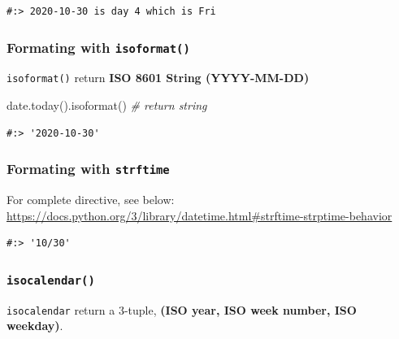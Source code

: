 \documentclass[
]{book}
\newenvironment{Shaded}{\begin{snugshade}}{\end{snugshade}}
\newcommand{\CommentTok}[1]{\textcolor[rgb]{0.37,0.37,0.37}{\textit{#1}}}
\newcommand{\NormalTok}[1]{#1}
\newcommand{\SpecialCharTok}[1]{\textcolor[rgb]{0,0,0}{#1}}
\newcommand{\StringTok}[1]{\textcolor[rgb]{0.5,0.5,0.5}{#1}}
\begin{document}
\begin{verbatim}
#:> 2020-10-30 is day 4 which is Fri
\end{verbatim}

\hypertarget{formating-with-isoformat}{%
\subsubsection{\texorpdfstring{Formating with \texttt{isoformat()}}{Formating with isoformat()}}\label{formating-with-isoformat}}

\texttt{isoformat()} return \textbf{ISO 8601 String (YYYY-MM-DD)}

\begin{Shaded}
\begin{Highlighting}[]
\NormalTok{date.today().isoformat() }\CommentTok{# return string}
\end{Highlighting}
\end{Shaded}

\begin{verbatim}
#:> '2020-10-30'
\end{verbatim}

\hypertarget{formating-with-strftime}{%
\subsubsection{\texorpdfstring{Formating with \texttt{strftime}}{Formating with strftime}}\label{formating-with-strftime}}

For complete directive, see below:\\
\url{https://docs.python.org/3/library/datetime.html\#strftime-strptime-behavior}

\begin{Shaded}
\end{Shaded}

\begin{verbatim}
#:> '10/30'
\end{verbatim}

\hypertarget{isocalendar}{%
\subsubsection{\texorpdfstring{\texttt{isocalendar()}}{isocalendar()}}\label{isocalendar}}

\texttt{isocalendar} return a 3-tuple, \textbf{(ISO year, ISO week number, ISO weekday)}.
\end{document}
